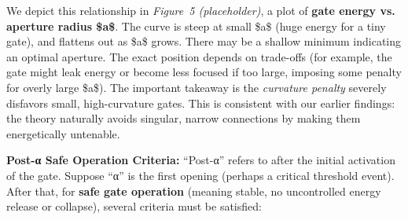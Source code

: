 \documentclass[]{article}
\begin{document}
We depict this relationship in \emph{Figure~5 (placeholder)}, a plot of
\textbf{gate energy vs. aperture radius \$a\$}. The curve is steep at
small \$a\$ (huge energy for a tiny gate), and flattens out as \$a\$
grows. There may be a shallow minimum indicating an optimal aperture.
The exact position depends on trade-offs (for example, the gate might
leak energy or become less focused if too large, imposing some penalty
for overly large \$a\$). The important takeaway is the \emph{curvature
penalty} severely disfavors small, high-curvature gates. This is
consistent with our earlier findings: the theory naturally avoids
singular, narrow connections by making them energetically untenable​.

\textbf{Post-α Safe Operation Criteria:} ``Post-α'' refers to after the
initial activation of the gate. Suppose ``α'' is the first opening
(perhaps a critical threshold event). After that, for \textbf{safe gate
operation} (meaning stable, no uncontrolled energy release or collapse),
several criteria must be satisfied:
\end{document}
